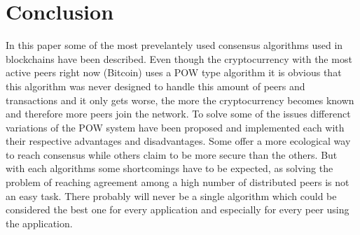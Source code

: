 \section{Conclusion}

In this paper some of the most prevelantely used consensus algorithms used in blockchains have been described. Even though the cryptocurrency with the most active peers right now (Bitcoin) uses
a POW type algorithm it is obvious that this algorithm was never designed to handle this amount of peers and transactions and it only gets worse, the more the cryptocurrency becomes known and therefore
more peers join the network. To solve some of the issues differenct variations of the POW system have been proposed and implemented each with their respective advantages and disadvantages.
Some offer a more ecological way to reach consensus while others claim to be more secure than the others. But with each algorithms some shortcomings have to be expected, as solving the problem
of reaching agreement among a high number of distributed peers is not an easy task. There probably will never be a single algorithm which could be considered the best one for every application
and especially for every peer using the application.
